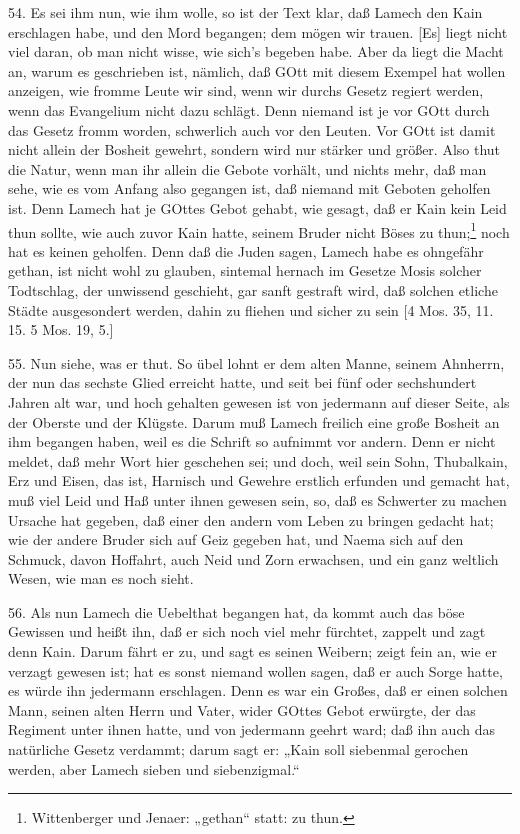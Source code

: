 54. Es sei ihm nun, wie ihm wolle, so ist der Text klar, daß Lamech den Kain erschlagen habe, und den Mord begangen; dem mögen wir trauen. [Es] liegt nicht viel daran, ob man nicht wisse, wie sich’s begeben habe. Aber da liegt die Macht an, warum es geschrieben ist, nämlich, daß GOtt mit diesem Exempel hat wollen anzeigen, wie fromme Leute wir sind, wenn wir durchs Gesetz regiert werden, wenn das Evangelium nicht dazu schlägt. Denn niemand ist je vor GOtt durch das Gesetz fromm worden, schwerlich auch vor den Leuten. Vor GOtt ist damit nicht allein der Bosheit gewehrt, sondern wird nur stärker und größer. Also thut die Natur, wenn man ihr allein die Gebote vorhält, und nichts mehr, daß man sehe, wie es vom Anfang also gegangen ist, daß niemand mit Geboten geholfen ist. Denn Lamech hat je GOttes Gebot gehabt, wie gesagt, daß er Kain kein Leid thun sollte, wie auch zuvor Kain hatte, seinem Bruder nicht Böses zu thun;\footnote{Wittenberger und Jenaer: „gethan“ statt: zu thun.} noch hat es keinen geholfen. Denn daß die Juden sagen, Lamech habe es ohngefähr gethan, ist nicht wohl zu glauben, sintemal hernach im Gesetze Mosis solcher Todtschlag, der unwissend geschieht, gar sanft gestraft wird, daß solchen etliche Städte ausgesondert werden, dahin zu fliehen und sicher zu sein [4 Mos. 35, 11. 15. 5 Mos. 19, 5.]

55. Nun siehe, was er thut. So übel lohnt er dem alten Manne, seinem Ahnherrn, der nun das sechste Glied erreicht hatte, und seit bei fünf oder sechshundert Jahren alt war, und hoch gehalten gewesen ist von jedermann auf dieser Seite, als der Oberste und der Klügste. Darum muß Lamech freilich eine große Bosheit an ihm begangen haben, weil es die Schrift so aufnimmt vor andern. Denn er nicht meldet, daß mehr Wort hier geschehen sei; und doch, weil sein Sohn, Thubalkain, Erz und Eisen, das ist, Harnisch und Gewehre erstlich erfunden und gemacht hat, muß viel Leid und Haß unter ihnen gewesen sein, so, daß es Schwerter zu machen Ursache hat gegeben, daß einer den andern vom Leben zu bringen gedacht hat; wie der andere Bruder sich auf Geiz gegeben hat, und Naema sich auf den Schmuck, davon Hoffahrt, auch Neid und Zorn erwachsen, und ein ganz weltlich Wesen, wie man es noch sieht.

56. Als nun Lamech die Uebelthat begangen hat, da kommt auch das böse Gewissen und heißt ihn, daß er sich noch viel mehr fürchtet, zappelt und zagt denn Kain. Darum fährt er zu, und sagt es seinen Weibern; zeigt fein an, wie er verzagt gewesen ist; hat es sonst niemand wollen sagen, daß er auch Sorge hatte, es würde ihn jedermann erschlagen. Denn es war ein Großes, daß er einen solchen Mann, seinen alten Herrn und Vater, wider GOttes Gebot erwürgte, der das Regiment unter ihnen hatte, und von jedermann geehrt ward; daß ihn auch das natürliche Gesetz verdammt; darum sagt er: „Kain soll siebenmal gerochen werden, aber Lamech sieben und siebenzigmal.“

